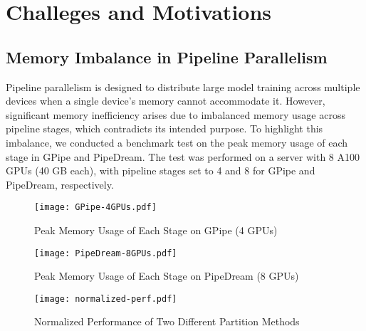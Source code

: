 \section{Challeges and Motivations}
\label{sec:cam}
\subsection{Memory Imbalance in Pipeline Parallelism}
Pipeline parallelism is designed to distribute large model training across multiple devices
when a single device's memory cannot accommodate it.
However, significant memory inefficiency arises due to imbalanced memory usage across pipeline stages,
which contradicts its intended purpose.
To highlight this imbalance,
we conducted a benchmark test on the peak memory usage of each stage in GPipe and PipeDream.
The test was performed on a server with 8 A100 GPUs (40 GB each),
with pipeline stages set to 4 and 8 for GPipe and PipeDream, respectively.
\begin{figure*}[t]
  \centering
  \begin{minipage}[t]{0.33\linewidth}
    \centering
    \texttt{[image: GPipe-4GPUs.pdf]}
    \caption{Peak Memory Usage of Each Stage on GPipe (4 GPUs)}
    \label{fig:gpipe-4gpus}
  \end{minipage}
  \begin{minipage}[t]{0.33\linewidth}
    \centering
    \texttt{[image: PipeDream-8GPUs.pdf]}
    \caption{Peak Memory Usage of Each Stage on PipeDream (8 GPUs)}
    \label{fig:pd-8gpus}
  \end{minipage}
  \begin{minipage}[t]{0.33\linewidth}
    \centering
    \texttt{[image: normalized-perf.pdf]}
    \caption{Normalized Performance of Two Different Partition Methods}
    \label{fig:norm-perf}
  \end{minipage}
\end{figure*}

